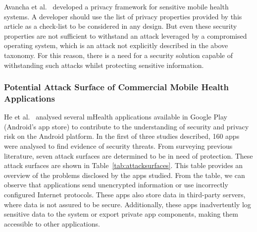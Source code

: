 Avancha et al.~\cite{avancha2012privacy} developed a privacy framework for sensitive mobile health systems. A developer should use the list of privacy properties provided by this article as a check-list to be considered in any design. But even these security properties are not sufficient to withstand an attack leveraged by a compromised operating system, which is an attack not explicitly described in the above taxonomy. For this reason, there is a need for a security solution capable of withstanding such attacks whilst protecting sensitive information.
 
\subsubsection{Potential Attack Surface of Commercial Mobile Health Applications}

He et al.~\cite{he2014security} analysed several mHealth applications available in Google Play (Android's app store) to contribute to the understanding of security and privacy risk on the Android platform. In the first of three studies described, 160 apps were analysed to find evidence of security threats. From surveying previous literature, seven attack surfaces are determined to be in need of protection. These attack surfaces are shown in Table~\ref{tab:attacksurfaces}. This table provides an overview of the problems disclosed by the apps studied. From the table, we can observe that applications send unencrypted information or use incorrectly configured Internet protocols. These apps also store data in third-party servers, where data is not assured to be secure. Additionally, these apps inadvertently log sensitive data to the system or export private app components, making them accessible to other applications.

